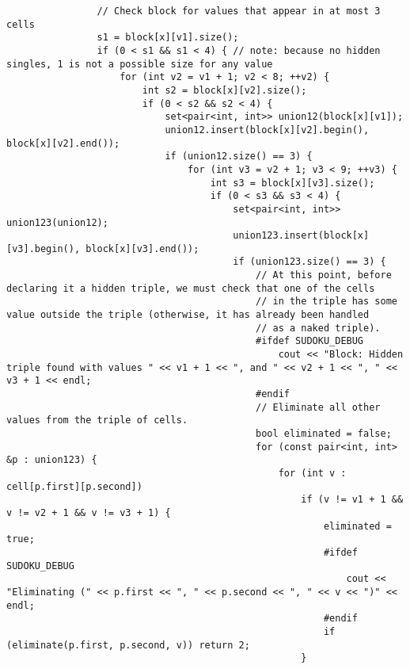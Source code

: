 \documentclass{article}
\begin{document}
\begin{lstlisting}
                // Check block for values that appear in at most 3 cells
                s1 = block[x][v1].size();
                if (0 < s1 && s1 < 4) { // note: because no hidden singles, 1 is not a possible size for any value
                    for (int v2 = v1 + 1; v2 < 8; ++v2) {
                        int s2 = block[x][v2].size();
                        if (0 < s2 && s2 < 4) {
                            set<pair<int, int>> union12(block[x][v1]);
                            union12.insert(block[x][v2].begin(), block[x][v2].end());
                            if (union12.size() == 3) {
                                for (int v3 = v2 + 1; v3 < 9; ++v3) {
                                    int s3 = block[x][v3].size();
                                    if (0 < s3 && s3 < 4) {
                                        set<pair<int, int>> union123(union12);
                                        union123.insert(block[x][v3].begin(), block[x][v3].end());
                                        if (union123.size() == 3) {
                                            // At this point, before declaring it a hidden triple, we must check that one of the cells
                                            // in the triple has some value outside the triple (otherwise, it has already been handled
                                            // as a naked triple).
                                            #ifdef SUDOKU_DEBUG
                                                cout << "Block: Hidden triple found with values " << v1 + 1 << ", and " << v2 + 1 << ", " << v3 + 1 << endl;
                                            #endif
                                            // Eliminate all other values from the triple of cells.
                                            bool eliminated = false;
                                            for (const pair<int, int> &p : union123) {
                                                for (int v : cell[p.first][p.second])
                                                    if (v != v1 + 1 && v != v2 + 1 && v != v3 + 1) {
                                                        eliminated = true;
                                                        #ifdef SUDOKU_DEBUG
                                                            cout << "Eliminating (" << p.first << ", " << p.second << ", " << v << ")" << endl;
                                                        #endif
                                                        if (eliminate(p.first, p.second, v)) return 2;
                                                    }

\end{lstlisting}
\end{document}

